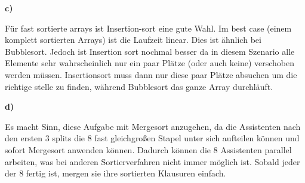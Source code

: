 \documentclass[a4paper,graphics,11pt]{article}
\begin{document}
\textbf{c)}

Für fast sortierte arrays ist Insertion-sort eine gute Wahl. Im best case (einem komplett sortierten Arrays)
ist die Laufzeit linear. Dies ist ähnlich bei Bubblesort. Jedoch ist Insertion sort nochmal besser da
in diesem Szenario alle Elemente sehr wahrscheinlich nur ein paar Plätze (oder auch keine) verschoben werden
müssen. Insertionsort muss dann nur diese paar Plätze absuchen um die richtige stelle zu finden, während Bubblesort
das ganze Array durchläuft.

\textbf{d)}

Es macht Sinn, diese Aufgabe mit Mergesort anzugehen, da die Assistenten nach den ersten 3 splits die 8 fast gleichgroßen
Stapel unter sich aufteilen können und sofort Mergesort anwenden können. Dadurch können die 8 Assistenten parallel arbeiten,
was bei anderen Sortierverfahren nicht immer möglich ist. Sobald jeder der 8 fertig ist, mergen sie ihre sortierten Klausuren
einfach.
\end{document}
